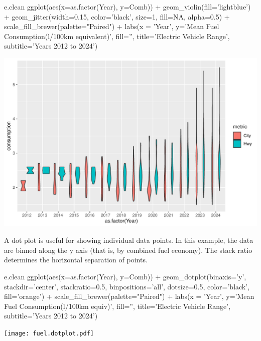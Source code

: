\begin{samepage}
\begin{Rcode}
e.clean %
  ggplot(aes(x=as.factor(Year), y=Comb)) +
    geom_violin(fill='lightblue') +
    geom_jitter(width=0.15, color='black', 
                size=1, fill=NA, alpha=0.5) + 
    scale_fill_brewer(palette="Paired") +
    labs(x = 'Year', 
         y='Mean Fuel Consumption\n(l/100km equivalent)', 
         fill='', 
         title='Electric Vehicle Range', 
         subtitle='Years 2012 to 2024')
\end{Rcode}
\end{samepage}

\begin{center}
  \includegraphics[width=.8\textwidth]{fuel.violin.pdf}
\end{center}

A dot plot is useful for showing individual data points. In this example, the data are binned along the y axis (that is, by combined fuel economy). The stack ratio determines the horizontal separation of points.

\begin{Rcode}
e.clean %
  ggplot(aes(x=as.factor(Year), y=Comb)) +
    geom_dotplot(binaxis='y', 
                 stackdir='center', 
                 stackratio=0.5,
                 binpositions='all',
                 dotsize=0.5, 
                 color='black', 
                 fill='orange') +
    scale_fill_brewer(palette="Paired") +
    labs(x = 'Year', 
         y='Mean Fuel Consumption\n(l/100km equiv)', 
         fill='', 
         title='Electric Vehicle Range', 
         subtitle='Years 2012 to 2024')
\end{Rcode}

\begin{center}
  \texttt{[image: fuel.dotplot.pdf]}
\end{center}

